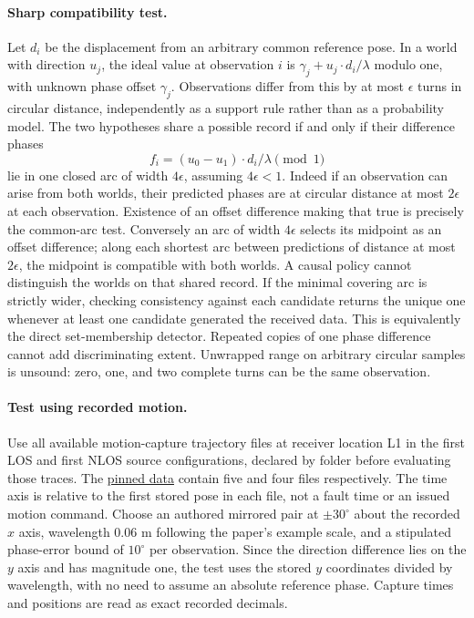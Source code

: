 \documentclass[11pt]{article}
\begin{document}
\paragraph{Sharp compatibility test.}
Let $d_i$ be the displacement from an arbitrary common reference pose. In a world with direction $u_j$, the ideal value at observation $i$ is $\gamma_j+u_j\cdot d_i/\lambda$ modulo one, with unknown phase offset $\gamma_j$. Observations differ from this by at most $\epsilon$ turns in circular distance, independently as a support rule rather than as a probability model. The two hypotheses share a possible record if and only if their difference phases
\[
    f_i=(u_0-u_1)\cdot d_i/\lambda \pmod 1
\]
lie in one closed arc of width $4\epsilon$, assuming $4\epsilon<1$. Indeed if an observation can arise from both worlds, their predicted phases are at circular distance at most $2\epsilon$ at each observation. Existence of an offset difference making that true is precisely the common-arc test. Conversely an arc of width $4\epsilon$ selects its midpoint as an offset difference; along each shortest arc between predictions of distance at most $2\epsilon$, the midpoint is compatible with both worlds. A causal policy cannot distinguish the worlds on that shared record. If the minimal covering arc is strictly wider, checking consistency against each candidate returns the unique one whenever at least one candidate generated the received data. This is equivalently the direct set-membership detector. Repeated copies of one phase difference cannot add discriminating extent. Unwrapped range on arbitrary circular samples is unsound: zero, one, and two complete turns can be the same observation.

\paragraph{Test using recorded motion.}
Use all available motion-capture trajectory files at receiver location L1 in the first LOS and first NLOS source configurations, declared by folder before evaluating those traces. The \href{https://github.com/Harvard-REACT/WSR-Toolbox-Dataset/tree/7c8cb67c8dff9553e39f65552c0de4bf427ba42c}{pinned data} contain five and four files respectively. The time axis is relative to the first stored pose in each file, not a fault time or an issued motion command. Choose an authored mirrored pair at $\pm30^\circ$ about the recorded $x$ axis, wavelength 0.06 m following the paper's example scale, and a stipulated phase-error bound of $10^\circ$ per observation. Since the direction difference lies on the $y$ axis and has magnitude one, the test uses the stored $y$ coordinates divided by wavelength, with no need to assume an absolute reference phase. Capture times and positions are read as exact recorded decimals.
\end{document}
